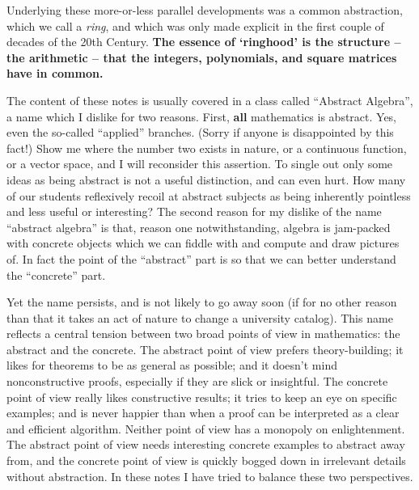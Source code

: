 Underlying these more-or-less parallel developments was a common abstraction, which we call a \emph{ring}, and which was only made explicit in the first couple of decades of the 20th Century. \textbf{The essence of `ringhood' is the structure -- the arithmetic -- that the integers, polynomials, and square matrices have in common.}

The content of these notes is usually covered in a class called ``Abstract Algebra'', a name which I dislike for two reasons. First, \textbf{all} mathematics is abstract. Yes, even the so-called ``applied'' branches. (Sorry if anyone is disappointed by this fact!) Show me where the number two exists in nature, or a continuous function, or a vector space, and I will reconsider this assertion. To single out only some ideas as being abstract is not a useful distinction, and can even hurt. How many of our students reflexively recoil at abstract subjects as being inherently pointless and less useful or interesting? The second reason for my dislike of the name ``abstract algebra'' is that, reason one notwithstanding, algebra is jam-packed with concrete objects which we can fiddle with and compute and draw pictures of. In fact the point of the ``abstract'' part is so that we can better understand the ``concrete'' part.

Yet the name persists, and is not likely to go away soon (if for no other reason than that it takes an act of nature to change a university catalog). This name reflects a central tension between two broad points of view in mathematics: the abstract and the concrete. The abstract point of view prefers theory-building; it likes for theorems to be as general as possible; and it doesn't mind nonconstructive proofs, especially if they are slick or insightful. The concrete point of view really likes constructive results; it tries to keep an eye on specific examples; and is never happier than when a proof can be interpreted as a clear and efficient algorithm. Neither point of view has a monopoly on enlightenment. The abstract point of view needs interesting concrete examples to abstract away from, and the concrete point of view is quickly bogged down in irrelevant details without abstraction. In these notes I have tried to balance these two perspectives.
